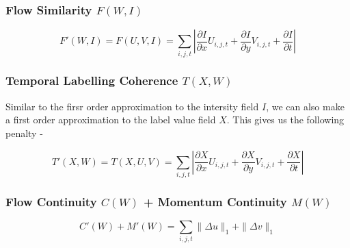 \subsubsection*{Flow Similarity $F(W,I)$}

\begin{equation}
F'(W,I)=F(U,V,I)=\underset{i,j,t}{\sum}|\frac{\partial I}{\partial x}U_{i,j,t}+\frac{\partial I}{\partial y}V_{i,j,t}+\frac{\partial I}{\partial t}|
\end{equation}



\subsubsection*{Temporal Labelling Coherence $T(X,W)$}

Similar to the firsr order approximation to the intersity field $I$,
we can also make a first order approximation to the label value field
$X$. This gives us the following penalty -

\begin{equation}
T'(X,W)=T(X,U,V)=\underset{i,j,t}{\sum}|\frac{\partial X}{\partial x}U_{i,j,t}+\frac{\partial X}{\partial y}V_{i,j,t}+\frac{\partial X}{\partial t}|
\end{equation}



\subsubsection*{Flow Continuity $C(W)$ + Momentum Continuity $M(W)$}

\begin{equation}
C'(W)+M'(W)=\underset{i,j,t}{\sum}\|\Delta u\|_{1}+\|\Delta v\|_{1}
\end{equation}

